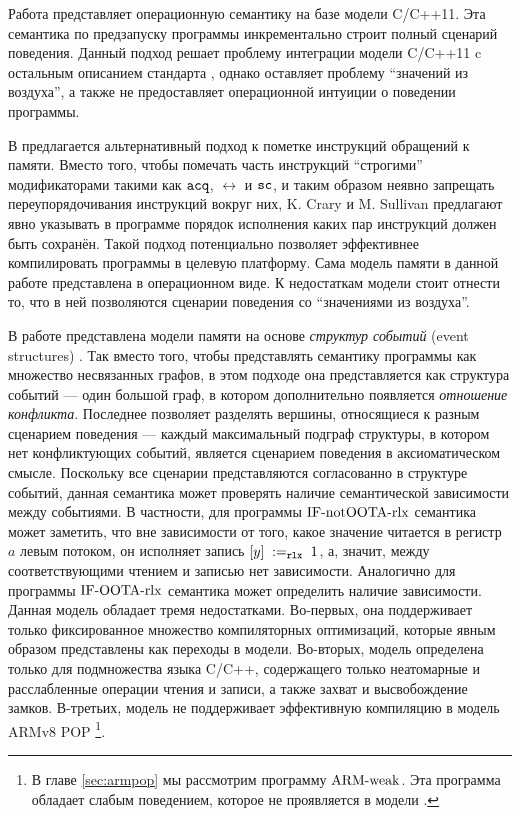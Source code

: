 Работа \cite{Nienhuis-al:OOPSLA16} представляет операционную семантику на базе модели C/C++11.
Эта семантика по предзапуску программы инкрементально строит полный сценарий поведения.
Данный подход решает проблему интеграции модели C/C++11 c остальным описанием стандарта \cite{Memarian-al:PLDI16},
однако оставляет проблему ``значений из воздуха'', а также не предоставляет операционной интуиции
о поведении программы.

В \cite{Crary-Sullivan:POPL15} предлагается альтернативный подход к пометке инструкций обращений к памяти.
Вместо того, чтобы помечать часть инструкций ``строгими'' модификаторами такими как ${\mathtt{acq}}$, $\rel$ и ${\mathtt{sc}}$,
и таким образом неявно запрещать переупорядочивания инструкций вокруг них, K. Crary и M. Sullivan предлагают
явно указывать в программе порядок исполнения каких пар инструкций должен быть сохранён.
Такой подход потенциально позволяет эффективнее компилировать программы в целевую платформу.
Сама модель памяти в данной работе представлена в операционном виде.
К недостаткам модели стоит отнести то, что в ней позволяются сценарии поведения со ``значениями из воздуха''.

В работе \cite{PichonPharabod-Sewell:POPL16} представлена модели памяти на основе \emph{структур событий}
(event structures) \cite{Winskel:AC86, Winskel:LTBT88}.
Так вместо того, чтобы представлять семантику программы как множество несвязанных графов,
в этом подходе она представляется как структура событий --- один большой граф,
в котором дополнительно появляется \emph{отношение конфликта}.
Последнее позволяет разделять вершины, относящиеся к разным сценарием поведения --- каждый максимальный подграф
структуры, в котором нет конфликтующих событий, является сценарием поведения в аксиоматическом смысле.
Поскольку все сценарии представляются согласованно в структуре событий, данная семантика может проверять
наличие семантической зависимости между событиями.
В частности, для программы ${\rm IF\text{-}notOOTA\text{-}rlx}$ семантика может заметить, что вне зависимости
от того, какое значение читается в регистр $a$ левым потоком, он исполняет запись $[y] \;:=_{\mathtt{rlx}}\;1$,
а, значит, между соответствующими чтением и записью нет зависимости.
Аналогично для программы ${\rm IF\text{-}OOTA\text{-}rlx}$ семантика может определить наличие зависимости.
Данная модель обладает тремя недостатками.
Во-первых, она поддерживает только фиксированное множество компиляторных оптимизаций,
которые явным образом представлены как переходы в модели.
Во-вторых, модель определена только для подмножества языка C/C++, содержащего только
неатомарные и расслабленные операции чтения и записи, а также захват и высвобождение замков.
В-третьих, модель не поддерживает эффективную компиляцию в модель
ARMv8 POP \cite{Flur-al:POPL16}\footnote{В главе \ref{sec:armpop} мы рассмотрим программу ${\rm ARM\text{-}weak}$.
Эта программа обладает слабым поведением, которое не проявляется в модели \cite{PichonPharabod-Sewell:POPL16}.}.

